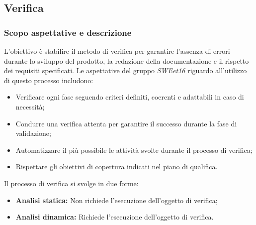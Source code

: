 \nonstopmode
\pagebreak
\subsection{Verifica}
\subsubsection{Scopo aspettative e descrizione}
L'obiettivo è stabilire il metodo di verifica per garantire l'assenza
di errori durante lo sviluppo del prodotto, la redazione della documentazione
e il rispetto dei requisiti specificati.
Le aspettative del gruppo \emph{SWEet16} riguardo all'utilizzo di questo processo includono:
\begin{itemize}
    \item Verificare ogni fase seguendo criteri definiti, coerenti e adattabili in caso di necessità;
    \item Condurre una verifica attenta per garantire il successo durante la fase di validazione;
    \item Automatizzare il più possibile le attività svolte durante il processo di verifica;
    \item Rispettare gli obiettivi di copertura indicati nel piano di qualifica.
\end{itemize}
Il processo di verifica si svolge in due forme:
\begin{itemize}
    \item \textbf{Analisi statica:} Non richiede l'esecuzione dell'oggetto di verifica;
    \item \textbf{Analisi dinamica:} Richiede l'esecuzione dell'oggetto di verifica.
\end{itemize}
